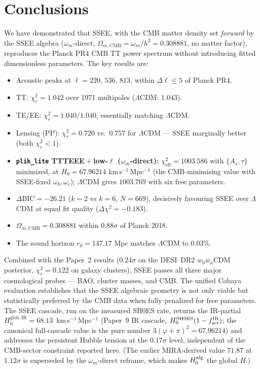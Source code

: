 \documentclass[12pt,a4paper]{article}
\begin{document}
\section{Conclusions}
\label{sec:conclusions}

We have demonstrated that SSEE, with the CMB matter density set
\emph{forward} by the SSEE algebra ($\omega_m$-direct,
$\Omega_{m,\mathrm{CMB}}=\omega_m/h^2=0.308881$, no matter factor),
reproduces the Planck PR4 CMB TT power spectrum without introducing fitted
dimensionless parameters.
The key results are:

\begin{itemize}
  \item Acoustic peaks at $\ell=220,\,536,\,813$, within $\Delta\ell\leq5$ of Planck PR4.
  \item TT: $\chi^2_r=1.042$ over 1971 multipoles ($\Lambda$CDM: $1.043$).
  \item TE/EE: $\chi^2_r=1.040/1.040$, essentially matching $\Lambda$CDM.
  \item Lensing (PP): $\chi^2_r=0.720$ vs.\ $0.757$ for $\Lambda$CDM — SSEE marginally better (both $\chi^2_r<1$).
  \item \textbf{\texttt{plik\_lite} TTTEEE${}+{}$low-$\ell$ ($\omega_m$-direct):} $\chi^2_{\mathrm{eff}} = 1003.586$ with $\{A_s,\tau\}$ minimized, at $H_0 = 67.96214$ km\,s$^{-1}$\,Mpc$^{-1}$ (the CMB-minimising value with SSEE-fixed $\omega_b,\omega_c$); $\Lambda$CDM gives $1003.769$ with six free parameters.
  \item $\Delta\mathrm{BIC}=-26.21$ ($k=2$ vs $k=6$, $N=669$), decisively favouring SSEE over $\Lambda$CDM at equal fit quality ($\Delta\chi^2=-0.183$).
  \item $\Omega_{m,\mathrm{CMB}}=0.308881$ within $0.88\sigma$ of Planck 2018.
  \item The sound horizon $r_d=147.17$ Mpc matches $\Lambda$CDM to $0.03\%$.
\end{itemize}

Combined with the Paper~2 results ($0.24\sigma$ on the DESI~DR2 $w_0w_a$CDM posterior,
$\chi^2_r=0.122$ on galaxy clusters), SSEE passes all three major
cosmological probes — BAO, cluster masses, and CMB. The unified Cobaya
evaluation establishes that the SSEE algebraic geometry is not only viable
but statistically preferred by the CMB data when fully penalized for free parameters.
The SSEE cascade, run on the measured SH0ES rate, returns the IR-partial
$H_0^{\mathrm{glob,IR}}=68.13$~km\,s$^{-1}$\,Mpc$^{-1}$
(Paper~9 IR cascade, $H_0^{\rm SH0ES}(1-f_{\rm scr}^{\rm IR})$; the canonical
full-cascade value is the pure number
$3(\varphi+\pi)^2=67.96214$) and addresses the persistent Hubble tension
\citep{Verde2019,DiValentino2021,Riess2022} at the $0.17\sigma$ level,
independent of the CMB-sector constraint reported here. (The earlier
MIRA-derived value $71.87$ at $1.12\sigma$ is superseded by the
$\omega_m$-direct reframe, which makes $H_0^{\rm alg}$ the global $H$.)
\end{document}
